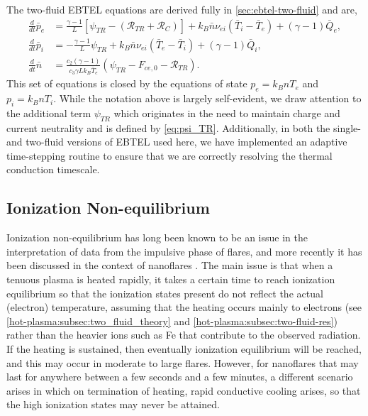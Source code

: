The two-fluid EBTEL equations are derived fully in \autoref{sec:ebtel-two-fluid} and are,
\begin{align}
    \frac{d}{dt}\bar{p}_e &= \frac{\gamma - 1}{L}[\psi_{TR} - (\mathcal{R}_{TR} + \mathcal{R}_C)] + k_B\bar{n}\nu_{ei}(\bar{T}_i-\bar{T}_e) + (\gamma-1)\bar{Q}_{e},\label{eq:press_e_0d_2fl} \\[0.5em]
    \frac{d}{dt}\bar{p}_i &= -\frac{\gamma - 1}{L}\psi_{TR} + k_B\bar{n}\nu_{ei}(\bar{T}_e-\bar{T}_i) + (\gamma-1)\bar{Q}_{i},\label{eq:press_i_0d_2fl} \\[0.5em]
    \frac{d}{dt}\bar{n} &= \frac{c_2(\gamma-1)}{c_3\gamma Lk_B\bar{T}_e}(\psi_{TR} - F_{ce,0}-\mathcal{R}_{TR}).	\label{eq:mass_0d_2fl}
\end{align}
This set of equations is closed by the equations of state $p_e=k_BnT_e$ and $p_i=k_BnT_i$. While the notation above is largely self-evident, we draw attention to the additional term $\psi_{TR}$ which originates in the need to maintain charge and current neutrality and is defined by \autoref{eq:psi_TR}. Additionally, in both the single- and two-fluid versions of EBTEL used here, we have implemented an adaptive time-stepping routine to ensure that we are correctly resolving the thermal conduction timescale.

\subsection{Ionization Non-equilibrium}\label{hot-plasma:subsec:nei_theory}

Ionization non-equilibrium has long been known to be an issue in the interpretation of data from the impulsive phase of flares, and more recently it has been discussed in the context of nanoflares \citep{bradshaw_explosive_2006,reale_nonequilibrium_2008}. The main issue is that when a tenuous plasma is heated rapidly, it takes a certain time to reach ionization equilibrium so that the ionization states present do not reflect the actual (electron) temperature, assuming that the heating occurs mainly to electrons (see \autoref{hot-plasma:subsec:two_fluid_theory} and \autoref{hot-plasma:subsec:two-fluid-res}) rather than the heavier ions such as Fe that contribute to the observed radiation. If the heating is sustained, then eventually ionization equilibrium will be reached, and this may occur in moderate to large flares. However, for nanoflares that may last for anywhere between a few seconds and a few minutes, a different scenario arises in which on termination of heating, rapid conductive cooling arises, so that the high ionization states may never be attained.

